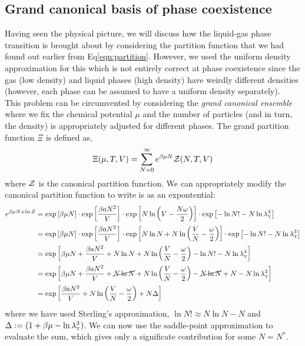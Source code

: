 \subsection{Grand canonical basis of phase coexistence}
Having seen the physical picture, we will discuss how the liquid-gas phase transition is brought about by considering the partition function that we had found out earlier from Eq\eqref{eqn:partition}. However, we used the uniform density approximation for this which is not entirely correct at phase coexistence since the gas (low density) and liquid phases (high density) have weirdly different densities (however, each phase can be assumed to have a uniform density separately).\\[0.2cm] This problem can be circumvented by considering the \textit{grand canonical ensemble} where we fix the chemical potential $\mu$ and the number of particles (and in turn, the density) is appropriately adjusted for different phases. The grand partition function $\Xi$ is defined as, 
\begin{equation}
    \label{eqn:gpf}
    \Xi(\mu,T,V) = \sum\limits_{N=0}^\infty e^{\beta \mu N}\mathcal Z(N,T,V)
\end{equation}
where $\mathcal Z$ is the canonical partition function. We can appropriately modify the canonical partition function to write is as an expontential:
\begin{align*}
    e^{\beta\mu N + \ln\mathcal Z}&=\exp\qty[\beta\mu N]\cdot\exp\qty[\frac{\beta a N^2}{V}]\cdot \exp\qty[N\ln\qty(V-\frac{N\omega}{2})]\cdot \exp\qty[-\ln N!-N\ln \lambda_{\text{\tiny T}}^3]\\
    &=\exp\qty[\beta\mu N]\cdot\exp\qty[\frac{\beta a N^2}{V}]\cdot \exp\qty[N\ln N +N\ln\qty(\frac{V}{N}-\frac{\omega}{2})]\cdot \exp\qty[-\ln N!-N\ln \lambda_{\text{\tiny T}}^3]\\
    &=\exp\qty[\beta \mu N+ \frac{\beta a N^2}{V}+N\ln N +N\ln\qty(\frac{V}{N}-\frac{\omega}{2})-\ln N!-N\ln \lambda_{\text{\tiny T}}^3]\\
    &=\exp\qty[\beta \mu N+\frac{\beta a N^2}{V}+\cancel{N\ln N} +N\ln\qty(\frac{V}{N}-\frac{\omega}{2})-\cancel{N\ln N} +N-N\ln \lambda_{\text{\tiny T}}^3]\\
    &=\exp\qty[\frac{\beta a N^2}{V} +N\ln\qty(\frac{V}{N}-\frac{\omega}{2}) +N\Delta]
\end{align*}
where we have used Sterling's approximation, $\ln N! \approx N\ln N - N$ and $\Delta:=(1+\beta\mu-\ln \lambda_{\text{\tiny T}}^3)$. We can now use the saddle-point approximation to evaluate the sum, which gives only a significate contribution for some $N=N^*$.
